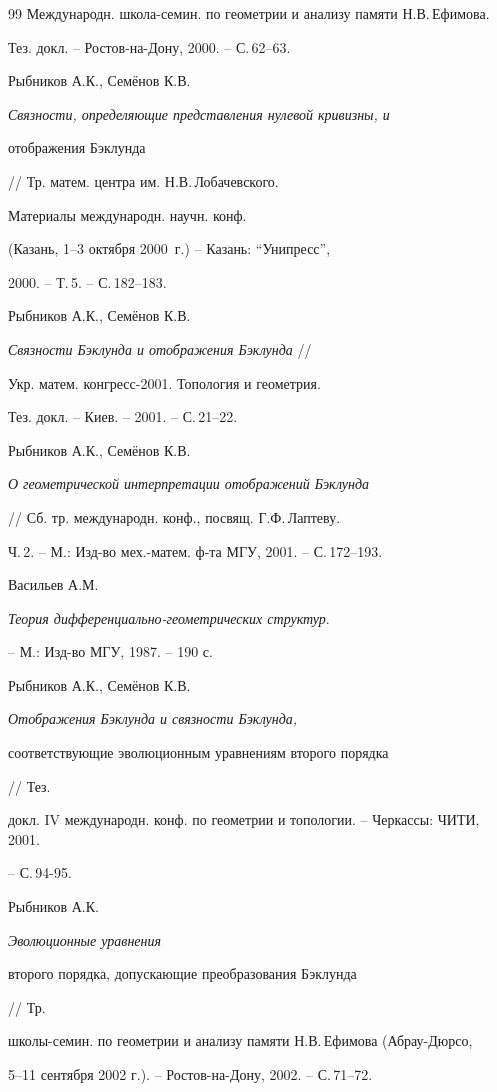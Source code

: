 \begin{thebibliography}{99}
Международн. школа-семин. по геометрии и анализу памяти Н.В.\,Ефимова. 


Тез. докл. -- Ростов-на-Дону, 2000. -- С.\,62--63.


 Рыбников А.К., Сем\"енов К.В. 


{\it Связности, определяющие представления нулевой кривизны, и 


отображения Бэклунда} // Тр. матем. центра им. Н.В.\,Лобачевского. 


Материалы международн. научн. конф.


(Казань, 1--3 октября 2000~г.) -- Казань: ``Унипресс'',


2000. -- Т.\,5. -- С.\,182--183.


 Рыбников А.К., Сем\"енов К.В. 


{\it Связности Бэклунда и отображения Бэклунда} // 


Укр. матем. конгресс-2001. Топология и геометрия. 


Тез. докл. -- Киев. -- 2001. -- С.\,21--22.


 Рыбников А.К., Сем\"енов К.В. 


{\it О геометрической интерпретации отображений Бэклунда}


// Сб. тр. международн. конф., посвящ. Г.Ф.\,Лаптеву. 


Ч.\,2. -- М.: Изд-во мех.-матем. ф-та МГУ, 2001. -- С.\,172--193.


 Васильев А.М. 


{\it Теория дифференциально-геометрических структур}.


-- М.: Изд-во МГУ, 1987. -- 190 с.


 Рыбников А.К., Сем\"енов К.В. 


{\it Отображения Бэклунда и связности Бэклунда, 


соответствующие эволюционным уравнениям второго порядка} // Тез. 


докл. IV международн. конф. по геометрии и топологии. -- Черкассы: ЧИТИ, 2001. 


-- С.\,94-95.


 Рыбников А.К. {\it Эволюционные уравнения 


второго порядка, допускающие преобразования Бэклунда} // Тр. 


школы-семин. по геометрии и анализу памяти Н.В.\,Ефимова (Абрау-Дюрсо, 


5--11 сентября 2002 г.). -- Ростов-на-Дону, 2002. -- С.\,71--72.



\end{thebibliography}
